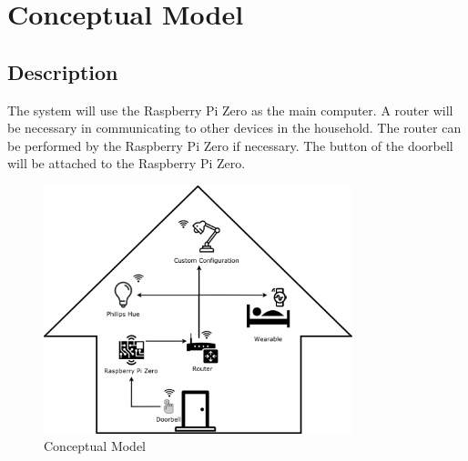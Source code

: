 \chapter{Conceptual Model}

\section{Description}
The system will use the Raspberry Pi Zero as the main computer. A router will be necessary in communicating to other devices in the household. The router can be performed by the Raspberry Pi Zero if necessary. The button of the doorbell will be attached to the Raspberry Pi Zero.

\begin{figure}[h]
  \includegraphics[width=0.8\textwidth]{ConceptualModel.png}
  \centering
  \caption{Conceptual Model}
  \label{fig:conceptualmodel}
\end{figure}